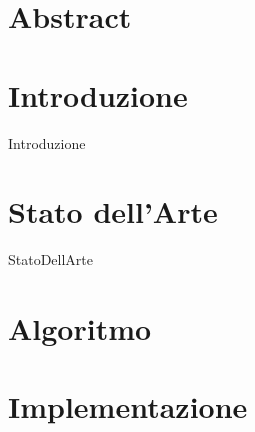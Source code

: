 \documentclass[12pt,oneside]{report}
\begin{document}
 
	                
	\begin{titlepage}
		
	\end{titlepage} 
    
    
	\chapter*{Abstract}
	
    \tableofcontents{}
    \listoftables
    \listoflistings
    \newpage
    \chapter{Introduzione}
    {Introduzione}
    \chapter{Stato dell'Arte}
    {StatoDellArte}
    \chapter{Algoritmo}
    \chapter{Implementazione}
 
     
    
\end{document}
